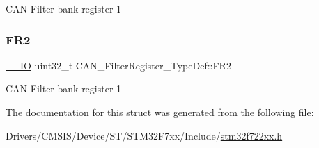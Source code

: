 C\+AN Filter bank register 1 \mbox{\label{struct_c_a_n___filter_register___type_def_a77959e28a302b05829f6a1463be7f800}} 
\subsubsection{\texorpdfstring{FR2}{FR2}}
{\footnotesize\ttfamily \mbox{\hyperlink{core__sc300_8h_aec43007d9998a0a0e01faede4133d6be}{\+\_\+\+\_\+\+IO}} uint32\+\_\+t C\+A\+N\+\_\+\+Filter\+Register\+\_\+\+Type\+Def\+::\+F\+R2}

C\+AN Filter bank register 1 

The documentation for this struct was generated from the following file\+:\begin{DoxyCompactItemize}
\item 
Drivers/\+C\+M\+S\+I\+S/\+Device/\+S\+T/\+S\+T\+M32\+F7xx/\+Include/\mbox{\hyperlink{stm32f722xx_8h}{stm32f722xx.\+h}}\end{DoxyCompactItemize}
